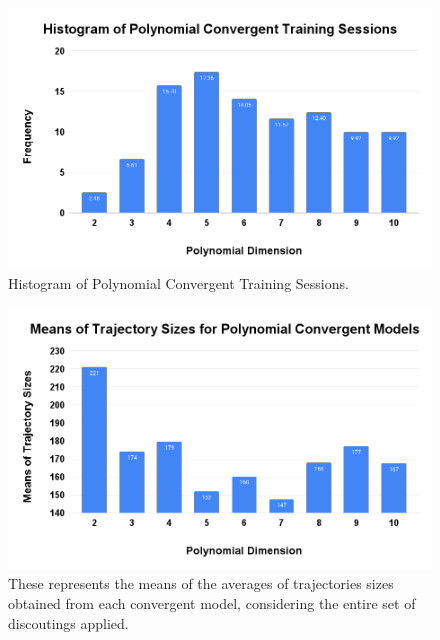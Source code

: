 \documentclass[10pt,twocolumn]{article}
\begin{document}
\begin{figure}[t]
  \includegraphics[scale=0.25]{histogram-polynomial-convergent-training-sessions.png}
  \caption{Histogram of Polynomial Convergent Training Sessions.}
  \label{histogram_polynomial_convergent_training_sessions}
\end{figure}

\begin{figure}[t]
  \includegraphics[scale=0.25]{means-of-trajectory-sizes-for-polynomial-convergent-models.png}
  \caption{These represents the means of the averages of trajectories sizes obtained from each convergent model, considering the entire set of discoutings applied.}
  \label{means_of_trajectory_sizes_for_polynomial_convergent_models}
\end{figure}
\end{document}
